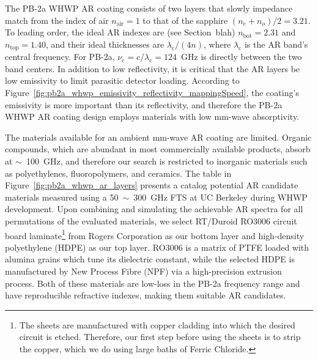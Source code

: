 The PB-2a WHWP AR coating consists of two layers that slowly impedance match from the index of air $n_{\mathrm{air}} = 1$ to that of the sapphire $(n_{e} + n_{o}) / 2 = 3.21$. To leading order, the ideal AR indexes are (see Section~blah) $n_{\mathrm{bot}} = 2.31$ and $n_{\mathrm{top}} = 1.40$, and their ideal thicknesses are $\lambda_{\mathrm{c}} / (4 n)$, where $\lambda_{\mathrm{c}}$ is the AR band's central frequency. For PB-2a, $\nu_{\mathrm{c}} = c / \lambda_{\mathrm{c}} = 124$~GHz is directly between the two band centers. In addition to low reflectivity, it is critical that the AR layers be low emissivity to limit parasitic detector loading. According to Figure~\ref{fig:pb2a_whwp_emissivity_reflectivity_mappingSpeed}, the coating's emissivity is more important than its reflectivity, and therefore the PB-2a WHWP AR coating design employs materials with low mm-wave absorptivity.

The materials available for an ambient mm-wave AR coating are limited. Organic compounds, which are abundant in most commercially available products, absorb at $\sim$~100~GHz, and therefore our search is restricted to inorganic materials such as polyethylenes, fluoropolymers, and ceramics. The table in Figure~\ref{fig:pb2a_whwp_ar_layers} presents a catalog potential AR candidate materials measured using a 50~$\sim$~300~GHz FTS at UC Berkeley during WHWP development. Upon combining and simulating the achievable AR spectra for all permutations of the evaluated materials, we select RT/Duroid RO3006 circuit board laminate\footnote{The sheets are manufactured with copper cladding into which the desired circuit is etched. Therefore, our first step before using the sheets is to strip the copper, which we do using large baths of Ferric Chloride.} from Rogers Corporation as our bottom layer and high-density polyethylene (HDPE) as our top layer. RO3006 is a matrix of PTFE loaded with alumina grains which tune its dielectric constant, while the selected HDPE is manufactured by New Process Fibre (NPF) via a high-precision extrusion process. Both of these materials are low-loss in the PB-2a frequency range and have reproducible refractive indexes, making them suitable AR candidates.

